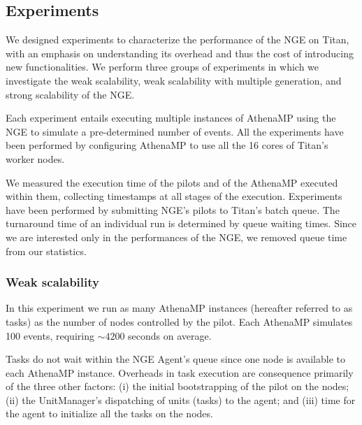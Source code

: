 
\subsection{Experiments}

We designed experiments to characterize the performance of the NGE on Titan,
with an emphasis on understanding its overhead and thus the cost of
introducing new functionalities.  We perform three groups of experiments in
which we investigate the weak scalability, weak scalability with multiple
generation, and strong scalability of the NGE. 

Each experiment entails executing multiple instances of AthenaMP using the NGE
to simulate a pre-determined number of events. All the experiments have been
performed by  configuring AthenaMP to use all the 16 cores  of Titan's worker
nodes.

We  measured the execution time of the pilots and of the AthenaMP  executed
within them, collecting timestamps at  all stages of the execution.
Experiments have been performed  by  submitting NGE's pilots  to Titan's batch
queue.  The turnaround time of an individual run is determined by queue
waiting times. Since we are interested only in the performances of the NGE, we
removed queue time from our statistics.

\subsubsection{Weak scalability}

In this experiment  we run as many AthenaMP instances (hereafter referred to
as tasks)  as the number of nodes controlled by the pilot. Each AthenaMP
simulates 100 events, requiring $\sim 4200$ seconds on average. 

Tasks do not  wait within the NGE Agent's queue since  one node  is available
to each AthenaMP instance.  Overheads in task execution are consequence
primarily of the three other factors: (i) the  initial bootstrapping of the
pilot on the nodes; (ii) the UnitManager's dispatching of  units (tasks) to
the agent; and (iii) time for the agent to initialize all the tasks on the nodes.


